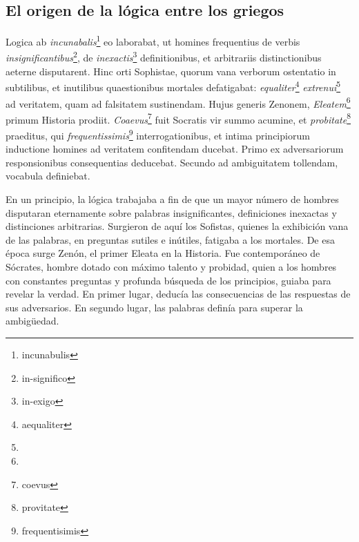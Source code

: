\message{ !name(tractatus.tex)}\documentclass{article}
\begin{document}
\begin{paracol}{2}
\begin{nthcolumn}{1}
    \subsection*{\centering El origen de la lógica entre los griegos} 
  \end{nthcolumn}
\vspace{0.5cm}
\begin{nthcolumn*}{0} %
  Logica ab \emph{incunabalis}\footnote{incunabulis} eo laborabat, ut homines frequentius de verbis \emph{insignificantibus}\footnote{in-significo}, de \emph{inexactis}\footnote{in-exigo} definitionibus, et arbitrariis distinctionibus aeterne disputarent. Hinc orti Sophistae, quorum vana verborum ostentatio in subtilibus, et inutilibus quaestionibus mortales defatigabat: \emph{equaliter}\footnote{aequaliter} \emph{extrenui}\footnote{ } ad veritatem, quam ad falsitatem sustinendam. Hujus generis Zenonem, \emph{Eleatem}\footnote{ } primum Historia prodiit. \emph{Coaevus}\footnote{coevus} fuit Socratis vir summo acumine, et \emph{probitate}\footnote{provitate} praeditus, qui \emph{frequentissimis}\footnote{frequentisimis} interrogationibus, et intima principiorum inductione homines ad veritatem confitendam ducebat. Primo ex adversariorum responsionibus consequentias deducebat. Secundo ad ambiguitatem tollendam, vocabula definiebat.
\end{nthcolumn*}
\vspace{0.5cm}
\begin{nthcolumn}{1} %
  En un principio, la lógica trabajaba a fin de que un mayor número de hombres disputaran eternamente sobre palabras insignificantes, definiciones inexactas y distinciones arbitrarias. Surgieron de aquí los Sofistas, quienes la exhibición vana de las palabras, en preguntas sutiles e inútiles, fatigaba a los mortales. De esa época surge Zenón, el primer Eleata en la Historia. Fue contemporáneo de Sócrates, hombre dotado con máximo talento y probidad, quien a los hombres con constantes preguntas y profunda búsqueda de los principios, guiaba para revelar la verdad. En primer lugar, deducía las consecuencias de las respuestas de sus adversarios. En segundo lugar, las palabras definía para superar la ambigüedad.
\end{nthcolumn}
\vspace{0.5cm}
\end{paracol}
\end{document}
